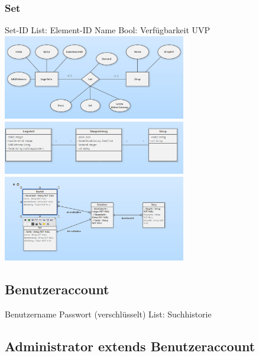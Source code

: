 \subsubsection{Set}
Set-ID \newline
List: Element-ID \newline
Name \newline
Bool: Verfügbarkeit \newline
UVP \newline  \newline
\includegraphics[width=8cm]{pictures/chen1.png} \newline  \newline
\includegraphics[width=8cm]{pictures/klassendiagramm2.png}  \newline  \newline
\includegraphics[width=8cm]{pictures/klassendiagramm.png} 

\subsection{Benutzeraccount}
Benutzername \newline
Passwort (verschlüsselt) \newline
List: Suchhistorie \newline

\subsection{Administrator extends Benutzeraccount}


